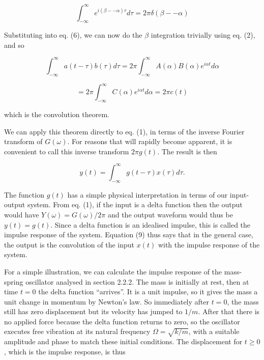   \begin{equation*}\int_{-\infty}^{\infty}{e^{i (\beta -- \alpha) \tau} d \tau} 
  = 2 \pi \delta (\beta -- \alpha) \tag{7}\end{equation*} 

  Substituting into eq. (6), we can now do the $\beta$ integration trivially 
  using eq. (2), and so 

  \begin{equation*}\int_{-\infty}^{\infty}{a(t-\tau) b(\tau) d \tau}=2 
  \pi\int_{-\infty}^{\infty}{A(\alpha) B(\alpha) e^{i \alpha t} d 
  \alpha}\end{equation*} 

  \begin{equation*}=2 \pi \int_{-\infty}^{\infty}{C(\alpha) e^{i \alpha t} d 
  \alpha} =2 \pi c(t) \tag{8}\end{equation*} 

  \noindent{}which is the convolution theorem. 

  We can apply this theorem directly to eq. (1), in terms of the inverse 
  Fourier transform of $G(\omega)$. For reasons that will rapidly become 
  apparent, it is convenient to call this inverse transform $2 \pi g(t)$. The 
  result is then 

  \begin{equation*}y(t)= \int_{-\infty}^{\infty}{g(t-\tau) x(\tau) d \tau} . 
  \tag{9}\end{equation*} 

  The function $g(t)$ has a simple physical interpretation in terms of our 
  input-output system. From eq. (1), if the input is a delta function then the 
  output would have $Y(\omega)=G(\omega)/2 \pi$ and the output waveform would 
  thus be $y(t)=g(t)$. Since a delta function is an idealised impulse, this is 
  called the impulse response of the system. Equation (9) thus says that in the 
  general case, the output is the convolution of the input $x(t)$ with the 
  impulse response of the system. 

  For a simple illustration, we can calculate the impulse response of the 
  mass-spring oscillator analysed in section 2.2.2. The mass is initially at 
  rest, then at time $t=0$ the delta function ``arrives''. It is a unit 
  impulse, so it gives the mass a unit change in momentum by Newton's law. So 
  immediately after $t=0$, the mass still has zero displacement but its 
  velocity has jumped to $1/m$. After that there is no applied force because 
  the delta function returns to zero, so the oscillator executes free vibration 
  at its natural frequency $\Omega=\sqrt{k/m}$, with a suitable amplitude and 
  phase to match these initial conditions. The displacement for $t \ge 0$, 
  which is the impulse response, is thus 

